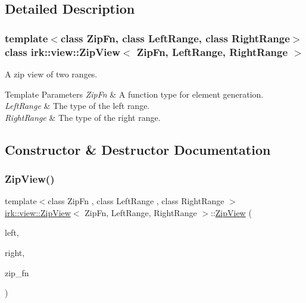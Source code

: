 \subsection{Detailed Description}
\subsubsection*{template$<$class Zip\+Fn, class Left\+Range, class Right\+Range$>$\newline
class irk\+::view\+::\+Zip\+View$<$ Zip\+Fn, Left\+Range, Right\+Range $>$}

A zip view of two ranges. 


\begin{DoxyTemplParams}{Template Parameters}
{\em Zip\+Fn} & A function type for element generation. \\
\hline
{\em Left\+Range} & The type of the left range. \\
\hline
{\em Right\+Range} & The type of the right range. \\
\hline
\end{DoxyTemplParams}


\subsection{Constructor \& Destructor Documentation}
\mbox{\label{classirk_1_1view_1_1ZipView_a538eabe5e10f14e89bbe394bf601af41}} 
\subsubsection{\texorpdfstring{Zip\+View()}{ZipView()}}
{\footnotesize\ttfamily template$<$class Zip\+Fn , class Left\+Range , class Right\+Range $>$ \\
\mbox{\hyperlink{classirk_1_1view_1_1ZipView}{irk\+::view\+::\+Zip\+View}}$<$ Zip\+Fn, Left\+Range, Right\+Range $>$\+::\mbox{\hyperlink{classirk_1_1view_1_1ZipView}{Zip\+View}} (\begin{DoxyParamCaption}\item[{const Left\+Range \&}]{left,  }\item[{const Right\+Range \&}]{right,  }\item[{Zip\+Fn}]{zip\+\_\+fn }\end{DoxyParamCaption})\hspace{0.3cm}{\ttfamily [inline]}}



